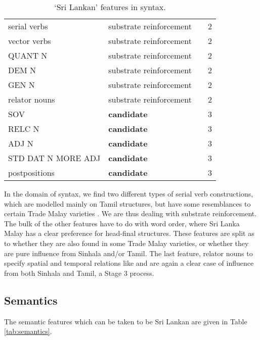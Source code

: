 \begin{table}[h!]
\centering
\begin{tabular}{p{4cm}p{4cm}p{2cm}l}
 serial verbs   & substrate reinforcement  &\tiny \citet{Paauw2004,Nordhofffcsvc} &  2 \\
 vector verbs  & substrate reinforcement  &  \tiny \citet{Paauw2004,Nordhofffcsvc} &  2 \\
 QUANT N     & substrate reinforcement & \tiny \citet{Adelaar1991,Paauw2004,Paauw2008phd} &  2 \\ 
 DEM N    & substrate reinforcement & \tiny \citet{Adelaar1991,Paauw2004,Paauw2008phd}  &  2 \\
 GEN N   & substrate reinforcement &  & 2 \\
 relator nouns  &  substrate reinforcement  &\tiny \citet{Paauw2004} &  2 \\
\hline
 SOV  & \textbf{candidate} & \tiny \citet{Adelaar1991}&  3 \\
 RELC N    & \textbf{candidate}  &\tiny \citet{Adelaar1991}&  3 \\
 ADJ N      & \textbf{candidate} & \tiny \citet{Adelaar1991}&  3 \\
 STD DAT N MORE ADJ  & \textbf{candidate}  &\tiny \citet[582-583]{Nordhoff2009} &  3 \\ 
 postpositions  & \textbf{candidate} & \tiny \citet{Adelaar1991}&  3 \\ 
\end{tabular}
\caption{`Sri Lankan' features in syntax.}
\label{tab:syntax}
\end{table} 

In the domain of syntax, we find two different types of serial verb constructions, which are modelled mainly on Tamil structures, but have some resemblances to certain Trade Malay varieties \citep{Nordhofffcsvc,Jaffartv}. We are thus dealing with substrate reinforcement. The bulk of the other features have to do with word order, where Sri Lanka Malay has a clear preference for head-final structures. These features are split as to whether they are also found in some Trade Malay varieties, or whether they are pure influence from Sinhala and/or Tamil. The last feature, relator nouns to specify spatial and temporal relations like  and  are again a clear case of influence from both Sinhala and Tamil, a Stage 3 process.


\newpage
\subsection{Semantics}
The semantic features which can be taken to be Sri Lankan are given in Table \ref{tab:semantics}.

